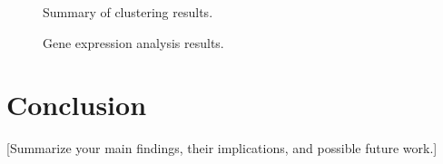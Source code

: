 \documentclass[12pt,letterpaper]{article}
\begin{document}
\begin{figure}[h!]
	\centering
	\caption{Summary of clustering results.}
	\label{fig:clustering}
\end{figure}

\begin{figure}[h!]
	\centering
	\caption{Gene expression analysis results.}
	\label{fig:gene_expression}
\end{figure}

\section{Conclusion}
[Summarize your main findings, their implications, and possible future work.]
\end{document}
